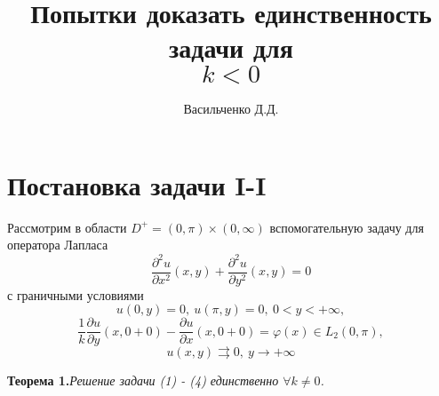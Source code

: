 \documentclass[9pt]{article}
\title{Попытки доказать единственность задачи для \[k < 0\]}
\author{ Васильченко Д.Д.}
\date{}
\begin{document}
	\maketitle
	\section{Постановка задачи I-I}
	Рассмотрим в области $D^{+} = (0, \pi) \times (0, \infty)$ вспомогательную задачу для оператора Лапласа 
	\begin{equation}
		\dfrac{\partial^2 u}{\partial x^2}(x,y) + \dfrac{\partial^2 u}{\partial y^2}(x,y) = 0
	\end{equation}
	с граничными условиями 
	\begin{equation}
		u(0,y) = 0, \ u(\pi, y) = 0, \ 0 < y < +\infty, 
	\end{equation}
	\begin{equation}
		\dfrac{1}{k} \dfrac{\partial u}{\partial y}(x,0+0) - \dfrac{\partial u}{\partial x}(x,0+0) = \varphi(x) \in L_2(0,\pi),
	\end{equation}
	\begin{equation}
		u(x,y) \rightrightarrows 0, \ y \to +\infty 
	\end{equation}
	
	\par
	\textbf{Теорема 1.}\textit{Решение задачи (1) - (4) единственно $\forall k \neq 0$.}
	
\end{document}
